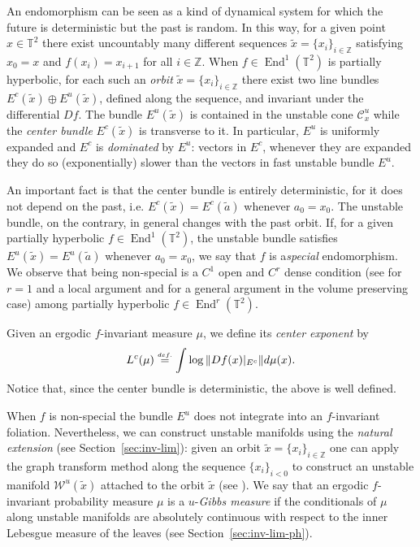 \documentclass[a4paper,11pt,reqno]{amsart}
\newcommand{\Z}{{\mathbb Z}}
\newcommand{\TT}{{\mathbb{T}^2}}
\newcommand{\cC}{{\mathcal C}}
\newcommand{\cW}{{\mathcal W}}
\newcommand{\eqdef}{\stackrel{\scriptscriptstyle\textrm def.}{=}}
\newcommand{\tix}{\tilde{x}}
\newcommand{\ta}{\tilde{a}}
\theoremstyle{definition}
\begin{document}
An endomorphism can be seen as a kind of dynamical system for which the future is deterministic but the past is random. In this way, for a given point $x\in\TT$ there exist uncountably many different sequences $\tix=\{x_i\}_{i\in\Z}$ satisfying $x_0=x$ and $f(x_i)=x_{i+1}$ for all $i \in \Z$. When $f\in\operatorname{End}^1(\TT)$ is partially hyperbolic, for each such an \emph{orbit} $\tix=\{x_i\}_{i\in\Z}$ there exist two line bundles $E^c(\tix)\oplus E^u(\tix)$, defined along the sequence, and invariant under the differential $Df$. The bundle $E^u(\tix)$ is contained in the unstable cone $\cC^u_x$ while the \emph{center bundle} $E^c(\tix)$ is transverse to it. In particular, $E^u$ is uniformly expanded and $E^c$ is \emph{dominated} by $E^u$: vectors in $E^c$, whenever they are expanded they do so (exponentially) slower than the vectors in fast unstable bundle $E^u$. 

An important fact is that the center bundle is entirely deterministic, for it does not depend on the past, i.e. $E^c(\tix)=E^c(\ta)$ whenever $a_0=x_0$. The unstable bundle, on the contrary, in general changes with the past orbit. If, for a given partially hyperbolic $f\in\operatorname{End}^1(\TT)$, the unstable bundle satisfies $E^u(\tix)=E^u(\ta)$ whenever $a_0=x_0$, we say that $f$ is a\emph{special} endomorphism. We observe that being non-special is a $C^1$ open and $C^r$ dense condition (see \cite{CostaMicena2022} for $r=1$ and a local argument and \cite{he2017accessibility} for a general argument in the volume preserving case) among partially hyperbolic $f\in\operatorname{End}^r(\TT)$.  

Given an ergodic $f$-invariant measure $\mu$, we define its \emph{center exponent} by
\[
L^c(\mu)\eqdef\int\log\|Df(x)|_{E^c}\|d\mu(x).
\]
Notice that, since the center bundle is deterministic, the above is well defined. 

When $f$ is non-special the bundle $E^u$ does not integrate into an $f$-invariant foliation. Nevertheless, we can construct unstable manifolds using the \emph{natural extension} (see Section~\ref{sec:inv-lim}): given an orbit $\tix=\{x_i\}_{i\in\Z}$ one can apply the graph transform method along the sequence $\{x_i\}_{i<0}$ to construct an unstable manifold $\cW^u(\tix)$ attached to the orbit $\tix$ (see \cite{QXZ2009}). We say that an ergodic $f$-invariant probability measure $\mu$ is a $u$-\emph{Gibbs measure} if the conditionals of $\mu$ along unstable manifolds are absolutely continuous with respect to the inner Lebesgue measure of the leaves (see Section~\ref{sec:inv-lim-ph}). 
\end{document}
